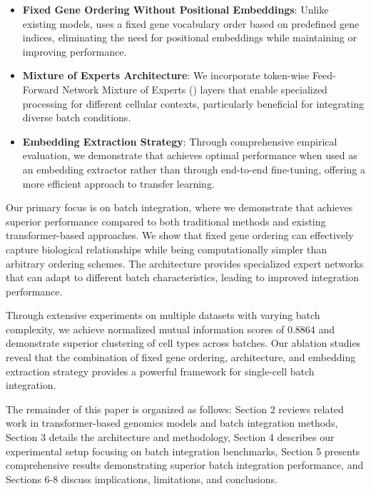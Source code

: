 \begin{itemize}
\item \textbf{Fixed Gene Ordering Without Positional Embeddings}: Unlike existing models, \bioformer{} uses a fixed gene vocabulary order based on predefined gene indices, eliminating the need for positional embeddings while maintaining or improving performance.

\item \textbf{Mixture of Experts Architecture}: We incorporate token-wise Feed-Forward Network Mixture of Experts (\moe{}) layers that enable specialized processing for different cellular contexts, particularly beneficial for integrating diverse batch conditions.

\item \textbf{Embedding Extraction Strategy}: Through comprehensive empirical evaluation, we demonstrate that \bioformer{} achieves optimal performance when used as an embedding extractor rather than through end-to-end fine-tuning, offering a more efficient approach to transfer learning.
\end{itemize}

Our primary focus is on batch integration, where we demonstrate that \bioformer{} achieves superior performance compared to both traditional methods and existing transformer-based approaches. We show that fixed gene ordering can effectively capture biological relationships while being computationally simpler than arbitrary ordering schemes. The \moe{} architecture provides specialized expert networks that can adapt to different batch characteristics, leading to improved integration performance.

Through extensive experiments on multiple datasets with varying batch complexity, we achieve normalized mutual information scores of 0.8864 and demonstrate superior clustering of cell types across batches. Our ablation studies reveal that the combination of fixed gene ordering, \moe{} architecture, and embedding extraction strategy provides a powerful framework for single-cell batch integration.

The remainder of this paper is organized as follows: Section 2 reviews related work in transformer-based genomics models and batch integration methods, Section 3 details the \bioformer{} architecture and methodology, Section 4 describes our experimental setup focusing on batch integration benchmarks, Section 5 presents comprehensive results demonstrating superior batch integration performance, and Sections 6-8 discuss implications, limitations, and conclusions.